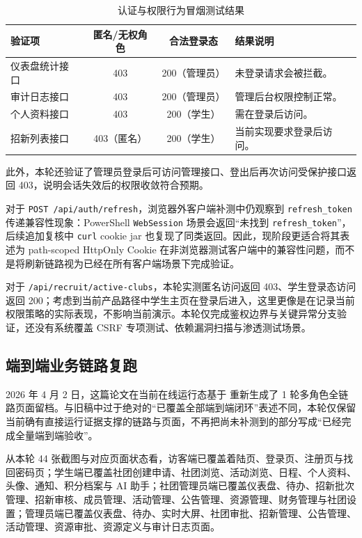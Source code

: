 \begin{table}[H]
\centering
\small
\caption{认证与权限行为冒烟测试结果}
\label{tab:security-smoke}
\begin{tabular}{p{5.3cm}ccp{4.6cm}}
\toprule
验证项 & 匿名/无权角色 & 合法登录态 & 结果说明 \\
\midrule
仪表盘统计接口 & 403 & 200（管理员） & 未登录请求会被拦截。 \\
审计日志接口 & 403 & 200（管理员） & 管理后台权限控制正常。 \\
个人资料接口 & 403 & 200（学生） & 需在登录后访问。 \\
招新列表接口 & 403（匿名） & 200（学生） & 当前实现要求登录后访问。 \\
\bottomrule
\end{tabular}
\end{table}

此外，本轮还验证了管理员登录后可访问管理接口、登出后再次访问受保护接口返回 403，说明会话失效后的权限收敛符合预期。

对于 \texttt{POST /api/auth/refresh}，浏览器外客户端补测中仍观察到 \texttt{refresh\_token} 传递兼容性现象：PowerShell \texttt{WebSession} 场景会返回“未找到 \texttt{refresh\_token}”，后续追加复核中 \texttt{curl} cookie jar 也复现了同类返回。因此，现阶段更适合将其表述为 path-scoped HttpOnly Cookie 在非浏览器测试客户端中的兼容性问题，而不是将刷新链路视为已经在所有客户端场景下完成验证。

对于 \texttt{/api/recruit/active-clubs}，本轮实测匿名访问返回 403、学生登录态访问返回 200；考虑到当前产品路径中学生主页在登录后进入，这里更像是在记录当前权限策略的实际表现，不影响当前演示。本轮仅完成鉴权边界与关键异常分支验证，还没有系统覆盖 CSRF 专项测试、依赖漏洞扫描与渗透测试场景。

\subsection{端到端业务链路复跑}

2026 年 4 月 2 日，这篇论文在当前在线运行态基于  重新生成了 1 轮多角色全链路页面留档。与旧稿中过于绝对的“已覆盖全部端到端闭环”表述不同，本轮仅保留当前确有直接运行证据支撑的链路与页面，不再把尚未补测到的部分写成“已经完成全量端到端验收”。

从本轮 44 张截图与对应页面状态看，访客端已覆盖着陆页、登录页、注册页与找回密码页；学生端已覆盖社团创建申请、社团浏览、活动浏览、日程、个人资料、头像、通知、积分档案与 AI 助手；社团管理员端已覆盖仪表盘、待办、招新批次管理、招新审核、成员管理、活动管理、公告管理、资源管理、财务管理与社团设置；管理员端已覆盖仪表盘、待办、实时大屏、社团审批、招新管理、公告管理、活动管理、资源审批、资源定义与审计日志页面。

